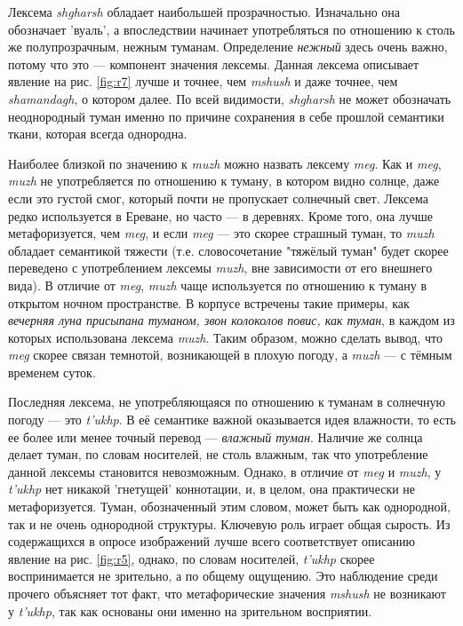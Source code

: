 \par Лексема \textit{shgharsh} обладает наибольшей прозрачностью. Изначально она обозначает 'вуаль', а впоследствии начинает употребляться по отношению к столь же полупрозрачным, нежным туманам. Определение \textit{нежный} здесь очень важно, потому что это --- компонент значения лексемы. Данная лексема описывает явление на рис. \ref{fig:r7} лучше и точнее, чем  \textit{mshush} и даже точнее, чем \textit{shamandagh}, о котором далее. По всей видимости, \textit{shgharsh} не может обозначать неоднородный туман именно по причине сохранения в себе прошлой семантики ткани, которая всегда однородна.


\par Наиболее близкой по значению к \textit{muzh} можно назвать лексему \textit{meg}. Как и \textit{meg}, \textit{muzh} не употребляется по отношению к туману, в котором видно солнце, даже если это густой смог, который почти не пропускает солнечный свет. Лексема редко используется в Ереване, но часто --- в деревнях. Кроме того, она лучше метафоризуется, чем \textit{meg}, и если \textit{meg} --- это скорее страшный туман, то \textit{muzh} обладает семантикой тяжести (т.е. словосочетание "тяжёлый туман" будет скорее переведено с употреблением лексемы \textit{muzh}, вне зависимости от его внешнего вида). В отличие от \textit{meg}, \textit{muzh} чаще используется по отношению к туману в открытом ночном пространстве. В корпусе встречены такие примеры, как \textit{вечерняя луна присыпана туманом, звон колоколов повис, как туман}, в каждом из которых использована лексема \textit{muzh}. Таким образом, можно сделать вывод, что \textit{meg} скорее связан темнотой, возникающей в плохую погоду, а \textit{muzh} --- с тёмным временем суток.

\par Последняя лексема, не употребляющаяся по отношению к туманам в солнечную погоду --- это \textit{t’ukhp}. В её семантике важной оказывается идея влажности, то есть ее более или менее точный перевод  --- \textit{влажный туман}. Наличие же солнца делает туман, по словам носителей, не столь влажным, так что употребление данной лексемы становится невозможным. Однако, в отличие от \textit{meg} и \textit{muzh}, у \textit{t’ukhp} нет никакой 'гнетущей' коннотации, и, в целом, она практически не метафоризуется. Туман, обозначенный этим словом, может быть как однородной, так и не очень однородной структуры. Ключевую роль играет общая сырость. Из содержащихся в опросе изображений лучше всего соответствует описанию явление на рис. \ref{fig:r5}, однако, по словам носителей, \textit{t’ukhp} скорее воспринимается не зрительно, а по общему ощущению. Это наблюдение среди прочего объясняет тот факт, что метафорические значения \textit{mshush} не возникают у \textit{t’ukhp}, так как основаны они именно на зрительном восприятии.

